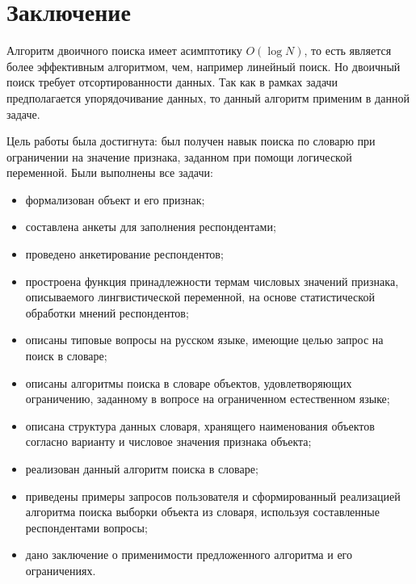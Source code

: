\chapter*{Заключение}

Алгоритм двоичного поиска имеет асимптотику $O(\log N)$, то есть является более эффективным алгоритмом, чем, например линейный поиск. Но двоичный поиск требует отсортированности данных. Так как в рамках задачи предполагается упорядочивание данных, то данный алгоритм применим в данной задаче.

Цель работы была достигнута: был получен навык поиска по словарю при ограничении на значение признака, заданном при помощи логической переменной. Были выполнены все задачи:

\begin{itemize}
	\item формализован объект и его признак;
	\item составлена анкеты для заполнения респондентами;
	\item проведено анкетирование респондентов;
	\item простроена функция принадлежности термам числовых значений признака, описываемого лингвистической переменной, на основе статистической обработки мнений респондентов;
	\item описаны типовые вопросы на русском языке, имеющие целью запрос на поиск в словаре;
	\item описаны алгоритмы поиска в словаре объектов, удовлетворяющих ограничению, заданному в вопросе на ограниченном естественном языке;
	\item описана структура данных словаря, хранящего наименования объектов согласно варианту и числовое значения признака объекта;
	\item реализован данный алгоритм поиска в словаре;
	\item приведены примеры запросов пользователя и сформированный реализацией алгоритма поиска выборки объекта из словаря, используя составленные респондентами вопросы;
	\item дано заключение о применимости предложенного алгоритма и его ограничениях.
\end{itemize}


\newpage